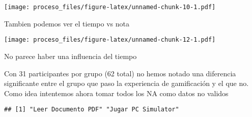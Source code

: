 \documentclass[
]{article}
\newenvironment{Shaded}{\begin{snugshade}}{\end{snugshade}}
\newcommand{\AttributeTok}[1]{\textcolor[rgb]{0.77,0.63,0.00}{#1}}
\newcommand{\DecValTok}[1]{\textcolor[rgb]{0.00,0.00,0.81}{#1}}
\newcommand{\FloatTok}[1]{\textcolor[rgb]{0.00,0.00,0.81}{#1}}
\newcommand{\FunctionTok}[1]{\textcolor[rgb]{0.00,0.00,0.00}{#1}}
\newcommand{\NormalTok}[1]{#1}
\newcommand{\OtherTok}[1]{\textcolor[rgb]{0.56,0.35,0.01}{#1}}
\newcommand{\SpecialCharTok}[1]{\textcolor[rgb]{0.00,0.00,0.00}{#1}}
\newcommand{\StringTok}[1]{\textcolor[rgb]{0.31,0.60,0.02}{#1}}
\begin{document}
\texttt{[image: proceso\_files/figure-latex/unnamed-chunk-10-1.pdf]}

Tambien podemos ver el tiempo vs nota

\begin{Shaded}
\end{Shaded}

\begin{Shaded}
\end{Shaded}

\texttt{[image: proceso\_files/figure-latex/unnamed-chunk-12-1.pdf]}

No parece haber una influencia del tiempo

Con 31 participantes por grupo (62 total) no hemos notado una diferencia
significante entre el grupo que paso la experiencia de gamificación y el
que no. Como idea intentemos ahora tomar todos los NA como datos no
validos

\begin{Shaded}
\end{Shaded}

\begin{verbatim}
## [1] "Leer Documento PDF" "Jugar PC Simulator"
\end{verbatim}
\end{document}
